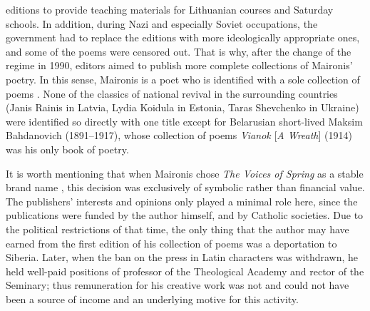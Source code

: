 \begin{paper}
{  editions to provide teaching materials for Lithuanian courses and
  Saturday schools. In addition, during Nazi and especially
  Soviet occupations, the government had to replace the editions with more ideologically appropriate
   ones, and some of the poems
  were censored out. That is why, after the change of the regime in
  1990, editors aimed to publish more complete collections of Maironis' poetry.} In this
sense, Maironis is a poet who is identified with a sole collection of poems \citep[62]{daujotyte_intention_1990}. None of the classics of national revival in the
surrounding countries (Janis Rainis in Latvia, Lydia Koidula in Estonia,
Taras Shevchenko in Ukraine) were identified so directly with one
title except for Belarusian short-lived Maksim Bahdanovich (1891--1917),
whose collection of poems \emph{Vianok} [\emph{A Wreath}] (1914) was his
only book of poetry.

It is worth mentioning that when Maironis chose \emph{The Voices of
Spring} as a stable brand name \citep[cf.][251 and 257]{kucinskiene_ankstyvasis_2014},
this decision was exclusively of symbolic rather than financial value. The
publishers' interests and opinions only played a minimal role here, since the publications were funded by the author himself, and by Catholic societies. Due to
the political restrictions of that time, the only thing that the author
may have earned from the first edition of his collection of poems was a
deportation to Siberia. Later, when the ban on the press in Latin
characters was withdrawn, he held well-paid positions of professor of
the Theological Academy and rector of the Seminary; thus remuneration
for his creative work was not and could not have been a source of income
and an underlying motive for this activity.


\end{paper}
